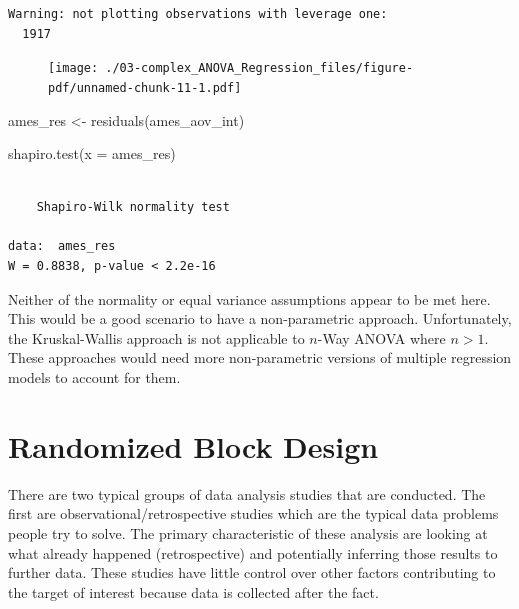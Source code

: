 \documentclass[
  letterpaper,
  DIV=11,
  numbers=noendperiod]{scrreprt}
\newenvironment{Shaded}{\begin{snugshade}}{\end{snugshade}}
\newcommand{\AttributeTok}[1]{\textcolor[rgb]{0.40,0.45,0.13}{#1}}
\newcommand{\FunctionTok}[1]{\textcolor[rgb]{0.28,0.35,0.67}{#1}}
\newcommand{\NormalTok}[1]{\textcolor[rgb]{0.00,0.23,0.31}{#1}}
\newcommand{\OtherTok}[1]{\textcolor[rgb]{0.00,0.23,0.31}{#1}}
\begin{document}
\begin{verbatim}
Warning: not plotting observations with leverage one:
  1917
\end{verbatim}

\begin{figure}[H]

{\centering \texttt{[image: ./03-complex\_ANOVA\_Regression\_files/figure-pdf/unnamed-chunk-11-1.pdf]}

}

\end{figure}

\begin{Shaded}
\begin{Highlighting}[]
\NormalTok{ames\_res }\OtherTok{\textless{}{-}} \FunctionTok{residuals}\NormalTok{(ames\_aov\_int)}

\FunctionTok{shapiro.test}\NormalTok{(}\AttributeTok{x =}\NormalTok{ ames\_res)}
\end{Highlighting}
\end{Shaded}

\begin{verbatim}

    Shapiro-Wilk normality test

data:  ames_res
W = 0.8838, p-value < 2.2e-16
\end{verbatim}

Neither of the normality or equal variance assumptions appear to be met
here. This would be a good scenario to have a non-parametric approach.
Unfortunately, the Kruskal-Wallis approach is not applicable to
\(n\)-Way ANOVA where \(n > 1\). These approaches would need more
non-parametric versions of multiple regression models to account for
them.

\hypertarget{randomized-block-design}{%
\section{Randomized Block Design}\label{randomized-block-design}}

There are two typical groups of data analysis studies that are
conducted. The first are observational/retrospective studies which are
the typical data problems people try to solve. The primary
characteristic of these analysis are looking at what already happened
(retrospective) and potentially inferring those results to further data.
These studies have little control over other factors contributing to the
target of interest because data is collected after the fact.
\end{document}
